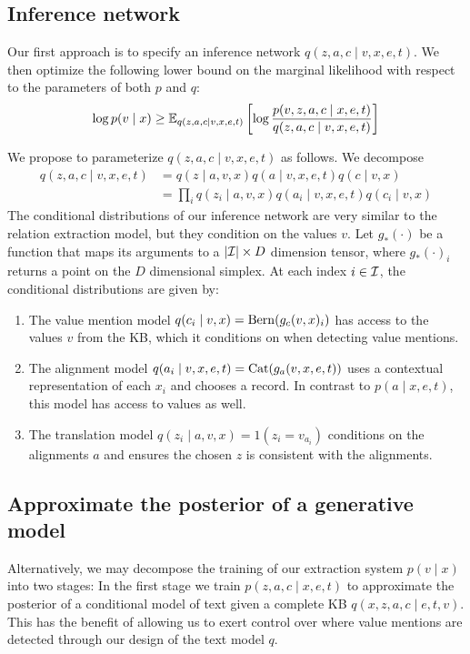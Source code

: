 \documentclass[12pt]{article}
\begin{document}
\subsection{Inference network}
Our first approach is to specify an inference network $q(z,a,c\mid v,x,e,t)$.
We then optimize the following lower bound on the marginal likelihood
with respect to the parameters of both $p$ and $q$:
\begin{equation}
\label{eqn:lowerbound}
\log p(v\mid x) \geq
\mathbb{E}_{q(z,a,c\mid v,x,e,t)}\left[\log \frac{p(v,z,a,c\mid x,e,t)}{q(z,a,c\mid v,x,e,t)}\right]
\end{equation}

We propose to parameterize $q(z,a,c\mid v,x,e,t)$ as follows.
We decompose 
\begin{equation}
\begin{aligned}
q(z,a,c\mid v,x,e,t) &= q(z \mid a,v,x)q(a\mid v,x,e,t)q(c \mid v,x)\\
&= \prod_i q(z_i \mid a,v,x)q(a_i \mid v,x,e,t)q(c_i \mid v,x)
\end{aligned}
\end{equation}
The conditional distributions of our inference network
are very similar to the relation extraction model,
but they condition on the values $v$.
Let $g_*(\cdot)$ be a function that maps its arguments to a $|\mathcal{I}| \times D$
dimension tensor, where $g_*(\cdot)_i$ returns a point on the $D$ dimensional simplex.
At each index $i \in \mathcal{I}$, the conditional distributions are given by:
\begin{enumerate}
\item The value mention model $q(c_i \mid v,x) = \mathrm{Bern}(g_{c}(v,x)_i)$ 
    has access to the values $v$ from the KB, which it conditions on
    when detecting value mentions. 
\item The alignment model $q(a_i \mid v,x,e,t) = \mathrm{Cat}(g_{a}(v,x,e,t))$
    uses a contextual representation of each $x_i$ and chooses a record.
    In contrast to $p(a\mid x,e,t)$, this model has access to values as well.
\item The translation model $q(z_i \mid a,v,x) = 1(z_i = v_{a_i})$
    conditions on the alignments $a$ and ensures the chosen $z$ is consistent
    with the alignments. 
\end{enumerate}

\subsection{Approximate the posterior of a generative model}
Alternatively, we may decompose the training of our extraction system $p(v\mid x)$ into two stages:
In the first stage we train $p(z,a,c\mid x,e,t)$ to approximate the posterior
of a conditional model of text given a complete KB $q(x,z,a,c \mid e,t,v)$.
This has the benefit of allowing us to exert control over where value mentions are detected
through our design of the text model $q$.
\end{document}
